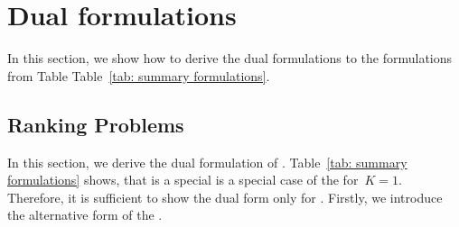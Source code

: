 \section{Dual formulations}

In this section, we show how to derive the dual formulations to the formulations from Table Table~\ref{tab: summary formulations}. 

\subsection{Ranking Problems}

In this section, we derive the dual formulation of \TopPushK. Table~\ref{tab: summary formulations} shows, that \TopPush is a special is a special case of the \TopPushK for~$K = 1.$ Therefore, it is sufficient to show the dual form only for \TopPushK. Firstly, we introduce the alternative form of the \TopPushK.

